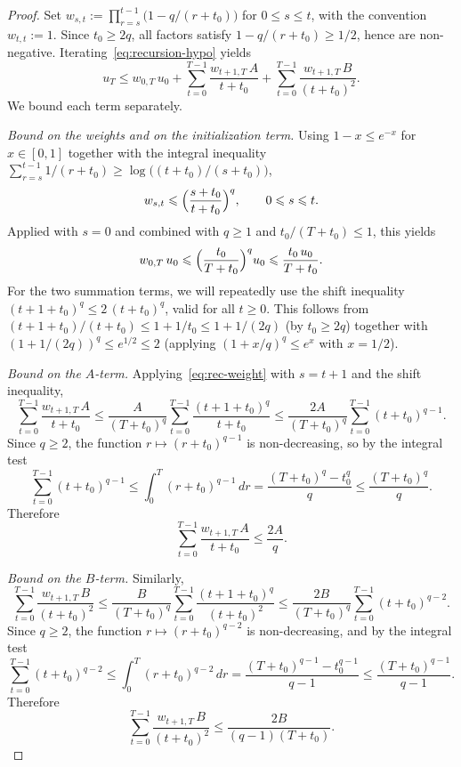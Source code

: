 \documentclass{article}
\renewcommand{\leq}{\leqslant}
\renewcommand{\geq}{\geqslant}
\theoremstyle{definition}
\begin{document}
\begin{proof}
Set $w_{s,t}:=\prod_{r=s}^{t-1}\bigl(1-q/(r+t_0)\bigr)$ for 
$0\leq s\leq t$, with the convention $w_{t,t}:=1$. Since 
$t_0\geq 2q$, all factors satisfy $1-q/(r+t_0)\geq 1/2$, hence are 
non-negative. Iterating~\eqref{eq:recursion-hypo} yields
\begin{equation}
\label{eq:rec-unroll}
u_T\leq w_{0,T}\,u_0
+\sum_{t=0}^{T-1}\frac{w_{t+1,T}\,A}{t+t_0}
+\sum_{t=0}^{T-1}\frac{w_{t+1,T}\,B}{(t+t_0)^2}.
\end{equation}
We bound each term separately.

\medskip
\noindent\textit{Bound on the weights and on the initialization term.}
Using $1-x\leq e^{-x}$ for $x\in[0,1]$ together with the integral 
inequality $\sum_{r=s}^{t-1}1/(r+t_0)\geq\log\bigl((t+t_0)/(s+t_0)\bigr)$,
\begin{equation}
\label{eq:rec-weight}
w_{s,t}\leq\Bigl(\frac{s+t_0}{t+t_0}\Bigr)^{q},\qquad 0\leq s\leq t.
\end{equation}
Applied with $s=0$ and combined with $q\geq 1$ and 
$t_0/(T+t_0)\leq 1$, this yields
\begin{equation}
\label{eq:rec-init}
w_{0,T}\,u_0
\leq\Bigl(\frac{t_0}{T+t_0}\Bigr)^q u_0
\leq\frac{t_0\,u_0}{T+t_0}.
\end{equation}
For the two summation terms, we will repeatedly use the shift 
inequality $(t+1+t_0)^q\leq 2\,(t+t_0)^q$, valid for all $t\geq 0$. 
This follows from $(t+1+t_0)/(t+t_0)\leq 1+1/t_0\leq 1+1/(2q)$ 
(by $t_0\geq 2q$) together with $(1+1/(2q))^q\leq e^{1/2}\leq 2$ 
(applying $(1+x/q)^q\leq e^x$ with $x=1/2$).

\medskip
\noindent\textit{Bound on the $A$-term.}
Applying~\eqref{eq:rec-weight} with $s=t+1$ and the shift 
inequality,
\[
\sum_{t=0}^{T-1}\frac{w_{t+1,T}\,A}{t+t_0}
\leq\frac{A}{(T+t_0)^q}\sum_{t=0}^{T-1}\frac{(t+1+t_0)^q}{t+t_0}
\leq\frac{2A}{(T+t_0)^q}\sum_{t=0}^{T-1}(t+t_0)^{q-1}.
\]
Since $q\geq 2$, the function $r\mapsto(r+t_0)^{q-1}$ is 
non-decreasing, so by the integral test
\[
\sum_{t=0}^{T-1}(t+t_0)^{q-1}
\leq\int_0^T(r+t_0)^{q-1}\,dr
=\frac{(T+t_0)^q-t_0^q}{q}
\leq\frac{(T+t_0)^q}{q}.
\]
Therefore
\begin{equation}
\label{eq:rec-A-bound}
\sum_{t=0}^{T-1}\frac{w_{t+1,T}\,A}{t+t_0}\leq\frac{2A}{q}.
\end{equation}

\medskip
\noindent\textit{Bound on the $B$-term.}
Similarly,
\[
\sum_{t=0}^{T-1}\frac{w_{t+1,T}\,B}{(t+t_0)^2}
\leq\frac{B}{(T+t_0)^q}\sum_{t=0}^{T-1}\frac{(t+1+t_0)^q}{(t+t_0)^2}
\leq\frac{2B}{(T+t_0)^q}\sum_{t=0}^{T-1}(t+t_0)^{q-2}.
\]
Since $q\geq 2$, the function $r\mapsto(r+t_0)^{q-2}$ is 
non-decreasing, and by the integral test
\[
\sum_{t=0}^{T-1}(t+t_0)^{q-2}
\leq\int_0^T(r+t_0)^{q-2}\,dr
=\frac{(T+t_0)^{q-1}-t_0^{q-1}}{q-1}
\leq\frac{(T+t_0)^{q-1}}{q-1}.
\]
Therefore
\begin{equation}
\label{eq:rec-B-bound}
\sum_{t=0}^{T-1}\frac{w_{t+1,T}\,B}{(t+t_0)^2}
\leq\frac{2B}{(q-1)(T+t_0)}.
\end{equation}


\end{proof}
\end{document}
